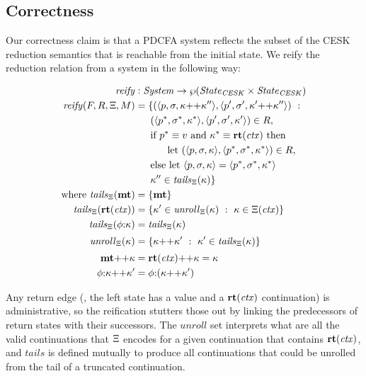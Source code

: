 \subsection{Correctness}

Our correctness claim is that a PDCFA system reflects the subset of the CESK reduction semantics that is reachable from the initial state.
%
We reify the reduction relation from a system in the following way:

\begin{align*}
  \reify &: \mathit{System} \to \wp(\mathit{State}_\mathit{CESK} \times \mathit{State}_\mathit{CESK}) \\
  \reify(F, R, \mktab, \mmemo) &=
  \setbuild{(\tpl{\mpoint,\mstore,\append{\mkont}{\mkont''}},
             \tpl{\mpoint',\mstore',\append{\mkont'}{\mkont''}})}
           {\\ &\phantom{= \{}(\tpl{\mpoint^*,\mstore^*,\mkont^*}, \tpl{\mpoint',\mstore',\mkont'}) \in R,
            \\ &\phantom{= \{}\text{if } \mpoint^*\equiv\mval \text{ and } \mkont^* \equiv \krt{\mctx} \text{ then }
            \\ &\phantom{= \{else }\text{let } (\tpl{\mpoint,\mstore,\mkont},\tpl{\mpoint^*,\mstore^*,\mkont^*}) \in R,
            \\ &\phantom{= \{}\text{else let } \tpl{\mpoint,\mstore,\mkont} = \tpl{\mpoint^*,\mstore^*,\mkont^*}
            \\ &\phantom{= \{}\mkont'' \in \tails{\mktab}{\mkont}} \\
\text{where } \tails{\mktab}{\kmt} &= \set{\kmt} \\
              \tails{\mktab}{\krt{\mctx}} &= \setbuild{\mkont' \in \unroll{\mktab}{\mkont}}{\mkont \in \mktab(\mctx)} \\
              \tails{\mktab}{\kcons{\mkframe}{\mkont}} &= \tails{\mktab}{\mkont}
\\[2pt]
              \unroll{\mktab}{\mkont} &= \setbuild{\append{\mkont}{\mkont'}}{\mkont' \in \tails{\mktab}{\mkont}}
\\[2pt]
              \append{\kmt}{\mkont} &= \append{\krt{\mctx}}{\mkont} = \mkont \\
              \append{\kcons{\mkframe}{\mkont}}{\mkont'} &= \kcons{\mkframe}{(\append{\mkont}{\mkont'})}
\end{align*}

Any return edge (\ie, the left state has a value and a $\mathbf{rt}(\mathit{ctx})$ continuation) is administrative, so the reification stutters those out by linking the predecessors of return states with their successors.
%
The $\mathit{unroll}$ set interprets what are all the valid continuations that $\Xi$ encodes for a given continuation that contains $\mathbf{rt}(\mathit{ctx})$, and $\mathit{tails}$ is defined mutually to produce all continuations that could be unrolled from the tail of a truncated continuation.

